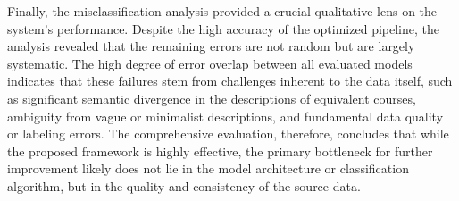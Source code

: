 Finally, the misclassification analysis provided a crucial qualitative lens on the system's performance. Despite the high accuracy of the optimized pipeline, the analysis revealed that the remaining errors are not random but are largely systematic. The high degree of error overlap between all evaluated models indicates that these failures stem from challenges inherent to the data itself, such as significant semantic divergence in the descriptions of equivalent courses, ambiguity from vague or minimalist descriptions, and fundamental data quality or labeling errors. The comprehensive evaluation, therefore, concludes that while the proposed framework is highly effective, the primary bottleneck for further improvement likely does not lie in the model architecture or classification algorithm, but in the quality and consistency of the source data.
